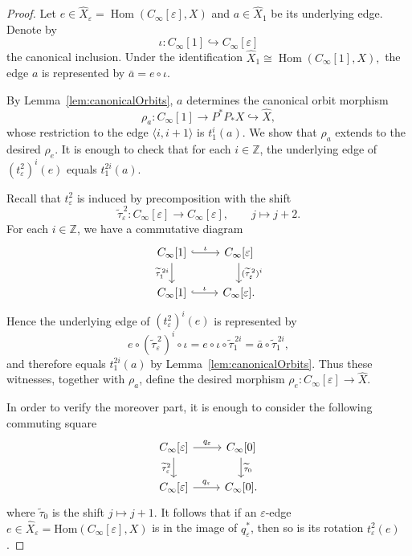 \documentclass{article}
\theoremstyle{plain}
\theoremstyle{definition}
\theoremstyle{remark}
\begin{document}
\begin{proof}
Let
\(
e\in\widehat X_\varepsilon
=\operatorname{Hom}(C_\infty[\varepsilon],X)
\)
and \(a\in\widehat X_1\) be its underlying edge. Denote by
\[
    \iota\colon C_\infty[1]\hookrightarrow C_\infty[\varepsilon]
\]
the canonical inclusion. Under the identification
\(
    \widehat{X}_1\cong\operatorname{Hom}(C_\infty[1],X),
\)
the edge \(a\) is represented by
\(
    \bar a=e\circ\iota.
\)

By Lemma~\ref{lem:canonicalOrbits}, \(a\) determines the canonical orbit morphism
\[
    \rho_a\colon C_\infty[1]\longrightarrow P^*P_*X
    \hookrightarrow\widehat X,
\]
whose restriction to the edge \(\langle i,i+1\rangle\) is \(t_1^i(a)\). We show that $\rho_a$ extends to
the desired $\rho_e$. It is enough to check that for each $i\in\mathbb{Z}$, the underlying edge of $(t^2_\varepsilon)^i(e)$ equals $t_1^{2i}(a)$.

Recall that \(t^2_\varepsilon\) is induced by precomposition
with the shift
\[
    \widetilde\tau_\varepsilon^{\,2}\colon
    C_\infty[\varepsilon]\longrightarrow C_\infty[\varepsilon],
    \qquad j\longmapsto j+2.
\]
For each \(i\in\mathbb Z\), we have a commutative diagram
\[
\begin{tikzcd}
C_\infty[1]
    \arrow[r,hook,"\iota"]
    \arrow[d,"\widetilde\tau_1^{\,2i}"']
&
C_\infty[\varepsilon]
    \arrow[d,"(\widetilde\tau_\varepsilon^{\,2})^i"]
\\
C_\infty[1]
    \arrow[r,hook,"\iota"]
&
C_\infty[\varepsilon].
\end{tikzcd}
\]
Hence the underlying edge of
\((t_\varepsilon^{2})^i(e)\) is represented by
\[
e\circ(\widetilde\tau_\varepsilon^{\,2})^i\circ\iota
=
e\circ\iota\circ\widetilde\tau_1^{\,2i}
=
\bar a\circ\widetilde\tau_1^{\,2i},
\]
and therefore equals \(t_1^{2i}(a)\) by Lemma~\ref{lem:canonicalOrbits}. Thus these witnesses, together with \(\rho_a\), define the desired
morphism \(\rho_e\colon C_\infty[\varepsilon]\to\widehat X\).

In order to verify the moreover part, it is enough to consider the following commuting square
\[
\begin{tikzcd}
C_\infty[\varepsilon]
    \arrow[r,"q_\varepsilon"]
    \arrow[d,"\widetilde\tau_\varepsilon^2"']
&
C_\infty[0]
    \arrow[d,"\widetilde\tau_0"]
\\
C_\infty[\varepsilon]
    \arrow[r,"q_\varepsilon"]
&
C_\infty[0].
\end{tikzcd}
\]
where $\tilde{\tau}_0$ is the shift $j\mapsto j+1$. It follows that if an $\varepsilon$-edge $e\in \widehat{X}_\varepsilon=\mathrm{Hom}(C_\infty[\varepsilon],X)$ is in the image of $q_\varepsilon^*$, then so is its rotation $t^2_\varepsilon(e)$.
\end{proof}
\end{document}
